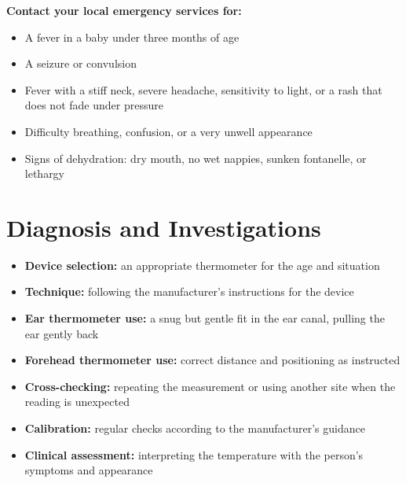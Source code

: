 \textbf{Contact your local emergency services for:}
\begin{itemize}
    \item A fever in a baby under three months of age
    \item A seizure or convulsion
    \item Fever with a stiff neck, severe headache, sensitivity to light, or a rash that does not fade under pressure
    \item Difficulty breathing, confusion, or a very unwell appearance
    \item Signs of dehydration: dry mouth, no wet nappies, sunken fontanelle, or lethargy
\end{itemize}

\section*{Diagnosis and Investigations}
\begin{itemize}
    \item \textbf{Device selection:} an appropriate thermometer for the age and situation
    \item \textbf{Technique:} following the manufacturer's instructions for the device
    \item \textbf{Ear thermometer use:} a snug but gentle fit in the ear canal, pulling the ear gently back
    \item \textbf{Forehead thermometer use:} correct distance and positioning as instructed
    \item \textbf{Cross-checking:} repeating the measurement or using another site when the reading is unexpected
    \item \textbf{Calibration:} regular checks according to the manufacturer's guidance
    \item \textbf{Clinical assessment:} interpreting the temperature with the person's symptoms and appearance
\end{itemize}

